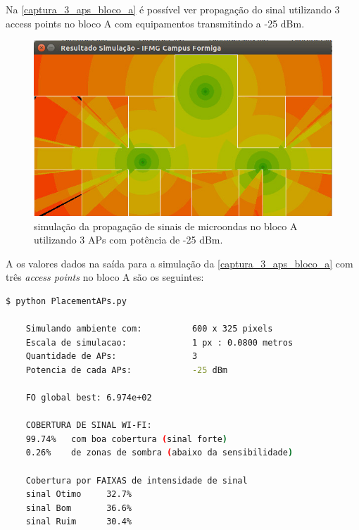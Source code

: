 \documentclass[
	12pt,				%
	openright,			%
	twoside,			%
	a4paper,			%
	english,			%
	french,				%
	spanish,			%
	brazil				%
	]{abntex2}
\begin{document}
Na \autoref{captura_3_aps_bloco_a} é possível ver propagação do sinal utilizando 3 access points no bloco A com equipamentos transmitindo a -25 dBm.

\begin{figure}[ht]
	\caption{\label{captura_3_aps_bloco_a}simulação da propagação de sinais de microondas no bloco A utilizando 3 APs com potência de -25 dBm.
	}
	\begin{center}
		\includegraphics[scale=0.7]{images/captura-3-aps-bloco-a.jpg}
	\end{center}
\end{figure}

\clearpage

A os valores dados na saída para a simulação da \autoref{captura_3_aps_bloco_a}  com três \textit{access points} no bloco A são os seguintes:

\begin{lstlisting}[language=bash]
	$ python PlacementAPs.py 
	
	Simulando ambiente com:          600 x 325 pixels
	Escala de simulacao:             1 px : 0.0800 metros
	Quantidade de APs:               3
	Potencia de cada APs:            -25 dBm
	
	FO global best: 6.974e+02
	
	COBERTURA DE SINAL WI-FI:
	99.74%   com boa cobertura (sinal forte)
	0.26%    de zonas de sombra (abaixo da sensibilidade)
	
	Cobertura por FAIXAS de intensidade de sinal
	sinal Otimo     32.7%
	sinal Bom       36.6%
	sinal Ruim      30.4%


\end{lstlisting}

\end{document}
